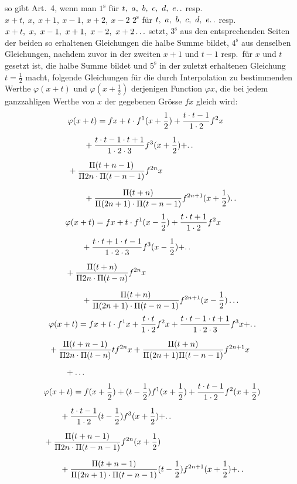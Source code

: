 so gibt Art.\ 4, wenn man $1^{\mathrm{s}}$ für $t,\ a,\ b,\ c,\ d,\ e\ldotp\ldotp$
resp.\ $x+t,\ x,\ x+1,\ x-1,\ x+2,\ x-2$ $2^{\mathrm{s}}$ für
$t,\ a,\ b,\ c,\ d,\ e\ldotp\ldotp$ resp.\ $x+t,\ x,\ x-1,\ x+1,\ x-2,\ x+2\mathinner{.\,.\,.}$ setzt,
$3^{\mathrm{s}}$ aus den entsprechenden Seiten der beiden so erhaltenen Gleichungen die halbe Summe bildet,
$4^{\mathrm{s}}$ aus denselben Gleichungen, nachdem zuvor in der zweiten $x+1$ und $t-1$ resp.\ für $x$ und $t$ gesetzt ist,
die halbe Summe bildet und $5^{\mathrm{s}}$ in der zuletzt erhaltenen Gleichung $t=\tfrac12$ macht,
folgende Gleichungen für die durch Interpolation zu bestimmenden Werthe $\varphi(x+t)$ und
$\varphi(x+\tfrac12)$ derjenigen Function $\varphi x$, die bei jedem ganzzahligen Werthe
von $x$ der gegebenen Grösse $fx$ gleich wird:
\[
\begin{aligned}
&\varphi(x+t)={}fx+t\cdot f^{1}(x+\frac12)+\frac{t\cdot t-1}{1\cdot2}f^{2}x
\\[6pt]
&\qquad{}+\frac{t\cdot t-1\cdot t+1}{1\cdot2\cdot3}f^{3}(x+\frac12)+\ldotp\ldotp\\[6pt]
&+\frac{\Pi(t+n-1)}{\Pi 2n\cdot\Pi(t-n-1)}f^{2n}x
\\[6pt]
&\qquad{}+\frac{\Pi(t+n)}{\Pi(2n+1)\cdot\Pi(t-n-1)}f^{2n+1}(x+\frac12)\ldotp\ldotp
\end{aligned}
\]
\[
\begin{aligned}
&\varphi(x+t)={}fx+t\cdot f^{1}(x-\frac12)+\frac{t\cdot t+1}{1\cdot2}f^{2}x
\\[6pt]
&\qquad{}+\frac{t\cdot t+1\cdot t-1}{1\cdot2\cdot3}f^{3}(x-\frac12)+\ldotp\ldotp\\[6pt]
&+\frac{\Pi(t+n)}{\Pi 2n\cdot\Pi(t-n)}f^{2n}x
\\[6pt]
&\qquad{}+\frac{\Pi(t+n)}{\Pi(2n+1)\cdot\Pi(t-n-1)}f^{2n+1}(x-\frac12)\mathinner{.\,.\,.}
\end{aligned}
\]
\[
\begin{aligned}
&\varphi(x+t)={}fx+t\cdot f^{1}x+\frac{t\cdot t}{1\cdot2}f^{2}x
+\frac{t\cdot t-1\cdot t+1}{1\cdot2\cdot3}f^{3}x+\ldotp\ldotp\\[6pt]
&+\frac{\Pi(t+n-1)}{\Pi 2n\cdot\Pi(t-n)}t f^{2n}x
+\frac{\Pi(t+n)}{\Pi(2n+1)\Pi(t-n-1)}f^{2n+1}x\\[6pt]
&\qquad{}+\mathinner{.\,.\,.}
\end{aligned}
\]
\[
\begin{aligned}
&\varphi(x+t)={}f(x+\frac12)+(t-\frac12)f^{1}(x+\frac12)
+\frac{t\cdot t-1}{1\cdot2}f^{2}(x+\frac12)
\\[6pt]
&\qquad{}+\frac{t\cdot t-1}{1\cdot2}(t-\frac12)f^{3}(x+\frac12)+\ldotp\ldotp\\[6pt]
&+\frac{\Pi(t+n-1)}{\Pi 2n\cdot\Pi(t-n-1)}f^{2n}(x+\frac12)
\\[6pt]
&\qquad{}+\frac{\Pi(t+n-1)}{\Pi(2n+1)\cdot\Pi(t-n-1)}(t-\frac12)f^{2n+1}(x+\frac12)+\ldotp\ldotp
\end{aligned}
\]
